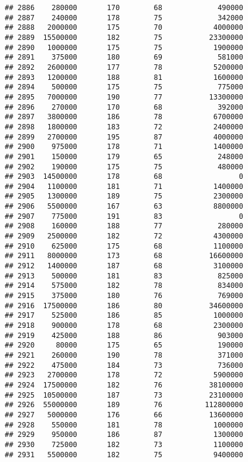 \documentclass[
]{article}
\begin{document}
\begin{verbatim}
## 2886    280000       170        68             490000
## 2887    240000       178        75             342000
## 2888   2000000       175        70            4000000
## 2889  15500000       182        75           23300000
## 2890   1000000       175        75            1900000
## 2891    375000       180        69             581000
## 2892   2600000       177        78            5200000
## 2893   1200000       188        81            1600000
## 2894    500000       175        75             775000
## 2895   7000000       190        77           13300000
## 2896    270000       170        68             392000
## 2897   3800000       186        78            6700000
## 2898   1800000       183        72            2400000
## 2899   2700000       195        87            4000000
## 2900    975000       178        71            1400000
## 2901    150000       179        65             248000
## 2902    190000       175        75             480000
## 2903  14500000       178        68                  0
## 2904   1100000       181        71            1400000
## 2905   1300000       189        75            2300000
## 2906   5500000       167        63            8800000
## 2907    775000       191        83                  0
## 2908    160000       188        77             280000
## 2909   2500000       182        72            4300000
## 2910    625000       175        68            1100000
## 2911   8000000       173        68           16600000
## 2912   1400000       187        68            3100000
## 2913    500000       181        83             825000
## 2914    575000       182        78             834000
## 2915    375000       180        76             769000
## 2916  17500000       186        80           34600000
## 2917    525000       186        85            1000000
## 2918    900000       178        68            2300000
## 2919    425000       188        86             903000
## 2920     80000       175        65             190000
## 2921    260000       190        78             371000
## 2922    475000       184        73             736000
## 2923   2700000       178        72            5900000
## 2924  17500000       182        76           38100000
## 2925  10500000       187        73           23100000
## 2926  55000000       189        76          112800000
## 2927   5000000       176        66           13600000
## 2928    550000       181        78            1000000
## 2929    950000       186        87            1300000
## 2930    725000       182        73            1100000
## 2931   5500000       182        75            9400000

\end{verbatim}
\end{document}

